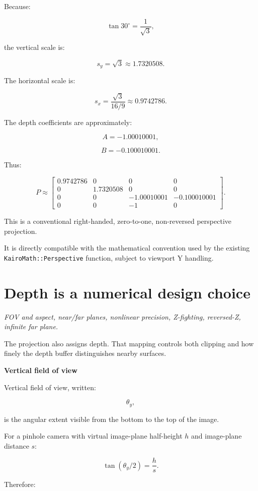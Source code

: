 Because:

\[
 \tan30^\circ=\frac1{\sqrt3},
\]

the vertical scale is:

\[
 s_y=\sqrt3\approx1.7320508.
\]

The horizontal scale is:

\[
 s_x=\frac{\sqrt3}{16/9} \approx0.9742786.
\]

The depth coefficients are approximately:

\[
 A=-1.00010001,
\]

\[
 B=-0.100010001.
\]

Thus:

\[
 \boxed{ P\approx \begin{bmatrix} 0.9742786&0&0&0\\ 0&1.7320508&0&0\\ 0&0&-1.00010001&-0.100010001\\ 0&0&-1&0 \end{bmatrix} }.
\]

This is a conventional right-handed, zero-to-one, non-reversed perspective projection.

It is directly compatible with the mathematical convention used by the existing \texttt{KairoMath::Perspective} function, subject to viewport Y handling.

\section{Depth is a numerical design choice}\label{02-foundations-ii-ch033-depth-is-a-numerical-design-choice}

\emph{FOV and aspect, near/far planes, nonlinear precision, Z-fighting, reversed-Z, infinite far plane.}

The projection also assigns depth. That mapping controls both clipping and how finely the depth buffer distinguishes nearby surfaces.

\textbf{Vertical field of view}

Vertical field of view, written:

\[
 \boxed{\theta_y},
\]

is the angular extent visible from the bottom to the top of the image.

For a pinhole camera with virtual image-plane half-height \(h\) and image-plane distance \(s\):

\[
 \boxed{ \tan(\theta_y/2)=\frac hs }.
\]

Therefore:

